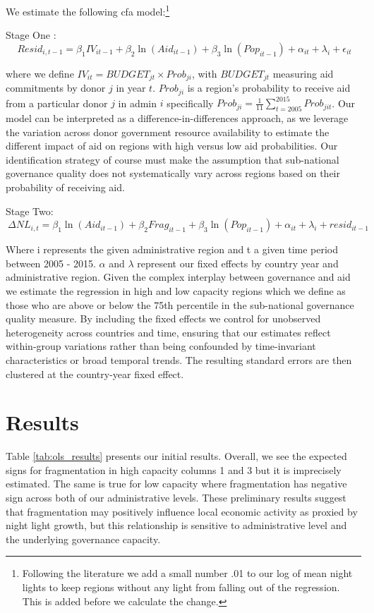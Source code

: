 \documentclass[11pt]{article}
\begin{document}
We estimate the following cfa model:\footnote{Following the literature we add a small number .01 to our log of mean night lights to keep regions without any light from falling out of the regression. This is added before we calculate the change.}

Stage One :
\[ \ 
Resid_{i,t-1} = \beta_1IV_{it-1} + \beta_2\ln(Aid_{it-1}) +  \beta_3 \ln(Pop_{it-1}) + \alpha_{it} + \lambda_i + \epsilon_{it}
\]

where we define $IV_{it} = BUDGET_{jt} \times Prob_{ji}$, with $BUDGET_{jt}$ measuring aid commitments by donor $j$ in year $t$. $Prob_{ji}$ is a region’s probability to receive aid from a particular donor $j$ in admin $i$ specifically $Prob_{ji} =\frac{1}{11}\sum_{t=2005}^{2015}Prob_{jit}$. Our model can be interpreted as a difference-in-differences approach, as we leverage the variation across donor government resource availability to estimate the different impact of aid on regions with high versus low aid probabilities. Our identification strategy of course must make the assumption that sub-national governance quality does not systematically vary across regions based on their probability of receiving aid.

Stage Two:
\[ \ 
\Delta NL_{i,t} = \beta_1\ln(Aid_{it-1}) + \beta_2 Frag_{it-1} +  \beta_3 \ln(Pop_{it-1}) + \alpha_{it} + \lambda_i + resid_{it-1}
\]

Where i represents the given administrative region and t a given time period between 2005 - 2015. $\alpha$ and $\lambda$ represent our fixed effects by country year and administrative region. Given the complex interplay between governance and aid we estimate the regression in high and low capacity regions which we define as those who are above or below the 75th percentile in the sub-national governance quality measure. By including the fixed effects we control for unobserved heterogeneity across countries and time, ensuring that our estimates reflect within-group variations rather than being confounded by time-invariant characteristics or broad temporal trends. The resulting standard errors are then clustered at the country-year fixed effect. 


\section{Results}

Table \ref{tab:ols_results} presents our initial results. Overall, we see the expected signs for fragmentation in high capacity columns 1 and 3 but it is imprecisely estimated. The same is true for low capacity where fragmentation has negative sign across both of our administrative levels. These preliminary results suggest that fragmentation may positively influence local economic activity as proxied by night light growth, but this relationship is sensitive to administrative level and the underlying governance capacity.
\end{document}
